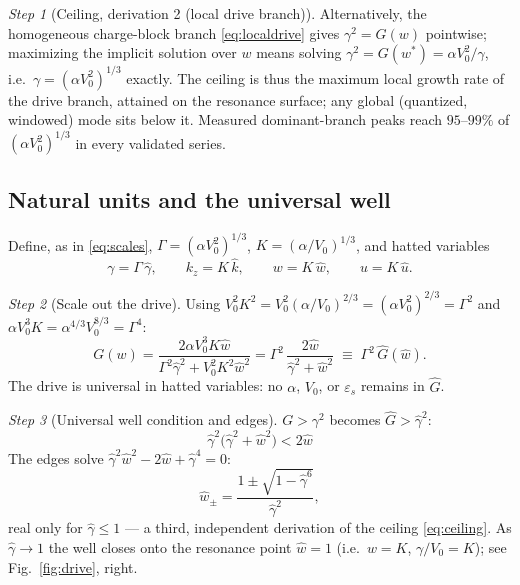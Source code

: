 \documentclass[11pt,a4paper]{article}
\numberwithin{equation}{section}
\theoremstyle{remark}
\newtheorem{step}{Step}[subsection]
\newcommand{\eps}{\varepsilon_s}                 %
\newcommand{\Vo}{V_0}
\newcommand{\kz}{k_z}
\newcommand{\Ceil}{\Gamma}                        %
\newcommand{\Kwn}{K}                              %
\begin{document}
\begin{step}[Ceiling, derivation 2 (local drive branch)]
Alternatively, the homogeneous charge-block branch \eqref{eq:localdrive}
gives $\gamma^2=G(w)$ pointwise; maximizing the implicit solution over $w$
means solving $\gamma^2=G(w^*)=\alpha\Vo^2/\gamma$, i.e.\
$\gamma=(\alpha\Vo^2)^{1/3}$ exactly. The ceiling is thus the maximum
local growth rate of the drive branch, attained on the resonance surface;
any global (quantized, windowed) mode sits below it. Measured
dominant-branch peaks reach $95$--$99\%$ of $(\alpha\Vo^2)^{1/3}$ in every
validated series.
\end{step}

\subsection{Natural units and the universal well}
\label{ssec:natural}

Define, as in \eqref{eq:scales}, $\Ceil=(\alpha\Vo^2)^{1/3}$,
$\Kwn=(\alpha/\Vo)^{1/3}$, and hatted variables
\begin{equation}
\gamma=\Ceil\,\hat\gamma,\qquad
\kz=\Kwn\,\hat k,\qquad
w=\Kwn\,\hat w,\qquad
u=\Kwn\,\hat u .
\end{equation}

\begin{step}[Scale out the drive]
Using $\Vo^2\Kwn^2=\Vo^2(\alpha/\Vo)^{2/3}=(\alpha\Vo^2)^{2/3}=\Ceil^2$
and $\alpha\Vo^3\Kwn=\alpha^{4/3}\Vo^{8/3}=\Ceil^4$:
\begin{equation}
G(w)=\frac{2\alpha\Vo^3\Kwn\hat w}{\Ceil^2\hat\gamma^2+\Vo^2\Kwn^2\hat w^2}
=\Ceil^2\,\frac{2\hat w}{\hat\gamma^2+\hat w^2}
\;\equiv\;\Ceil^2\,\hat G(\hat w).
\label{eq:Ghat}
\end{equation}
The drive is universal in hatted variables: no $\alpha$, $\Vo$, or $\eps$
remains in $\hat G$.
\end{step}

\begin{step}[Universal well condition and edges]
$G>\gamma^2$ becomes $\hat G>\hat\gamma^2$:
\begin{equation}
\boxed{\;\hat\gamma^2\bigl(\hat\gamma^2+\hat w^2\bigr)<2\hat w\;}
\label{eq:wellhat}
\end{equation}
The edges solve $\hat\gamma^2\hat w^2-2\hat w+\hat\gamma^4=0$:
\begin{equation}
\hat w_\pm=\frac{1\pm\sqrt{1-\hat\gamma^6}}{\hat\gamma^2},
\label{eq:welledges}
\end{equation}
real only for $\hat\gamma\le1$ --- a third, independent derivation of the
ceiling \eqref{eq:ceiling}. As $\hat\gamma\to1$ the well closes onto the
resonance point $\hat w=1$ (i.e.\ $w=\Kwn$, $\gamma/\Vo=\Kwn$); see
Fig.~\ref{fig:drive}, right.
\end{step}
\end{document}
